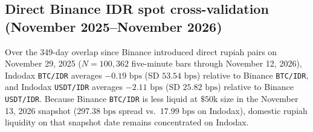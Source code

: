 \subsection{Direct Binance IDR spot cross-validation (November 2025--November 2026)}
Over the 349-day overlap since Binance introduced direct rupiah pairs on November 29, 2025 ($N = 100,362$ five-minute bars through November 12, 2026), Indodax \texttt{BTC/IDR} averages $-0.19\text{ bps}$ (SD $53.54\text{ bps}$) relative to Binance \texttt{BTC/IDR}, and Indodax \texttt{USDT/IDR} averages $-2.11\text{ bps}$ (SD $25.82\text{ bps}$) relative to Binance \texttt{USDT/IDR}. Because Binance \texttt{BTC/IDR} is less liquid at $\$50\text{k}$ size in the November 13, 2026 snapshot ($297.38\text{ bps}$ spread vs.\ $17.99\text{ bps}$ on Indodax), domestic rupiah liquidity on that snapshot date remains concentrated on Indodax.
